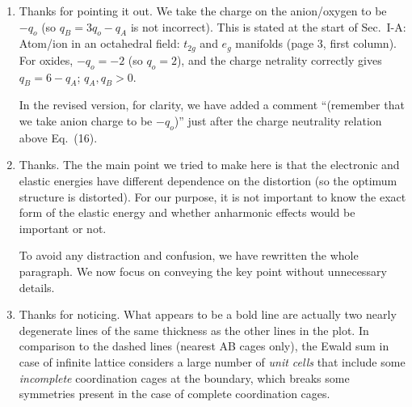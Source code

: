\documentclass[a4paper,prb]{revtex4-1}  %
\newcommand{\rev}[1]{{\color{blue}{#1}}}
\begin{document}
\begin{enumerate}
\item
\rev{It is not clearly explained how exactly the authors define sign of
q0, qA,qB. E.g. the charge neutrality relation mentioned above (16) is
$qB = 3q0 - qA$. For oxides q0 is -2 and $qA>0$ and does not typically
exceed +4, but then $qB<0$. Obviously the authors used some other
conventions, but do not really explain this.
}

Thanks for pointing it out.
We take the charge on the anion/oxygen to be $-q_o$ (so $q_B=3q_o-q_A$ is not incorrect).
This is stated at the start of  
Sec.~I-A: Atom/ion in an octahedral field: $t_{2g}$  and $e_g$ manifolds (page 3, first column).
For oxides, $-q_o=-2$ (so $q_o=2$), and the charge netrality correctly gives $q_B=6-q_A$;
$q_A, q_B >0$. 


In the revised version,
for clarity,
we have added a comment ``(remember that we take anion charge to be $-q_o$)''
just after the charge neutrality relation above Eq.~(16).


\item
\rev{
I'm not sure that it is clear for a general reader why from volume
dependence $V = a^3 (\delta_1 + \delta_2)$ follows that the elastic energy
must be proportional to $(\delta_1 + \delta_2)^2$ [BTW one of the
subscripts is wrong]. OK, they know from the high-school courses that
the elastic term must quadratic and could agree, but why the same
logic applies to $(\alpha^2 + \beta^2)^2$ can be not clear. Moreover,
it's not clear a priori why there is no cubic terms. Please explain
this part in more detail.
}

Thanks. 
The the main point we
tried to make here is that 
the electronic and elastic energies have different dependence on the distortion (so the optimum structure is distorted).
For our purpose, it is not important to know the exact form of the elastic energy and whether anharmonic effects would be important or not.

To avoid any distraction and confusion,
we have rewritten the whole paragraph. 
We now focus
on conveying the key point without
unnecessary details.




\item
\rev{
Fig. 7. Should not be there explained what a bold line means? And
why there is no a bold line for dashed curves?
}


Thanks for noticing. 
What appears to be a bold line are actually two nearly degenerate lines of the same thickness as the other lines in the plot.
In comparison to the dashed lines (nearest AB cages only), 
the Ewald sum
in case of infinite lattice considers
a large number of \emph{unit cells}
that include some \emph{incomplete}
coordination cages at the boundary, 
 which breaks some symmetries present in the 
 case of complete coordination cages.
 

\end{enumerate}
\end{document}
